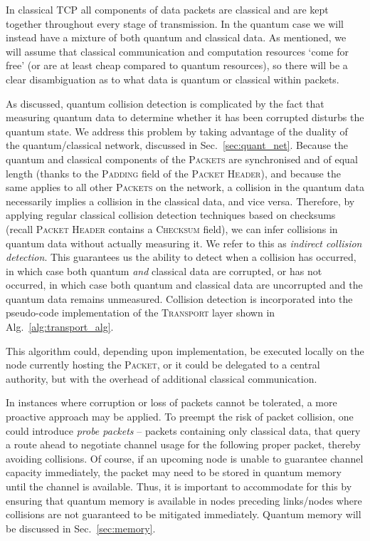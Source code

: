 \documentclass[aps, rmp, twocolumn, amsmath, amssymb, nofootinbib, superscriptaddress, longbibliography, floatfix, table-of-contents, eqsecnum]{revtex4-1}
\begin{document}
In classical TCP all components of data packets are classical and are kept together throughout every stage of transmission. In the quantum case we will instead have a mixture of both quantum and classical data. As mentioned, we will assume that classical communication and computation resources `come for free' (or are at least cheap compared to quantum resources), so there will be a clear disambiguation as to what data is quantum or classical within packets.

As discussed, quantum collision detection is complicated by the fact that measuring quantum data to determine whether it has been corrupted disturbs the quantum state. We address this problem by taking advantage of the duality of the quantum/classical network, discussed in Sec.~\ref{sec:quant_net}. Because the quantum and classical components of the \textsc{Packets} are synchronised and of equal length (thanks to the \textsc{Padding} field of the \textsc{Packet Header}), and because the same applies to all other \textsc{Packets} on the network, a collision in the quantum data necessarily implies a collision in the classical data, and vice versa. Therefore, by applying regular classical collision detection techniques based on checksums (recall \textsc{Packet Header} contains a \textsc{Checksum} field), we can infer collisions in quantum data without actually measuring it. We refer to this as \textit{indirect collision detection}. This guarantees us the ability to detect when a collision has occurred, in which case both quantum \textit{and} classical data are corrupted, or has not occurred, in which case both quantum and classical data are uncorrupted and the quantum data remains unmeasured. Collision detection is incorporated into the pseudo-code implementation of the \textsc{Transport} layer shown in Alg.~\ref{alg:transport_alg}.

This algorithm could, depending upon implementation, be executed locally on the node currently hosting the \textsc{Packet}, or it could be delegated to a central authority, but with the overhead of additional classical communication.

In instances where corruption or loss of packets cannot be tolerated, a more proactive approach may be applied. To preempt the risk of packet collision, one could introduce \textit{probe packets} -- packets containing only classical data, that query a route ahead to negotiate channel usage for the following proper packet, thereby avoiding collisions. Of course, if an upcoming node is unable to guarantee channel capacity immediately, the packet may need to be stored in quantum memory until the channel is available. Thus, it is important to accommodate for this by ensuring that quantum memory is available in nodes preceding links/nodes where collisions are not guaranteed to be mitigated immediately. Quantum memory will be discussed in Sec.~\ref{sec:memory}.
\end{document}
